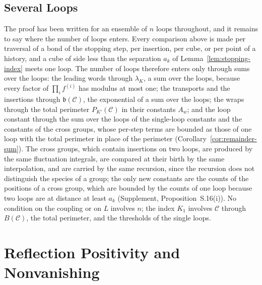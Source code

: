 \documentclass[11pt]{preprint}
\numberwithin{equation}{section}
\theoremstyle{definition}
\theoremstyle{remark}
\theoremstyle{plain}
\begin{document}
\subsection{Several Loops}\label{sec:several-loops-cauchy}

The proof has been written for an ensemble of $n$ loops throughout, and it remains to say where the number of loops enters. Every comparison above is made per traversal of a bond of the stopping step, per insertion, per cube, or per point of a history, and a cube of side less than the separation $a_k$ of Lemma~\ref{lem:stopping-index} meets one loop. The number of loops therefore enters only through sums over the loops: the leading words through $\lambda_K$, a sum over the loops, because every factor of $\prod_if^{(i)}$ has modulus at most one; the transports and the insertions through $\mathfrak b(\mathcal C)$, the exponential of a sum over the loops; the wraps through the total perimeter $P_{K'}(\mathcal C)$ in their constants $A_w$; and the loop constant through the sum over the loops of the single-loop constants and the constants of the cross groups, whose per-step terms are bounded as those of one loop with the total perimeter in place of the perimeter (Corollary~\ref{cor:remainder-sum}). The cross groups, which contain insertions on two loops, are produced by the same fluctuation integrals, are compared at their birth by the same interpolation, and are carried by the same recursion, since the recursion does not distinguish the species of a group; the only new constants are the counts of the positions of a cross group, which are bounded by the counts of one loop because two loops are at distance at least $a_k$ (Supplement, Proposition~S.16(i)). No condition on the coupling or on $L$ involves $n$; the index $K_1$ involves $\mathcal C$ through $B(\mathcal C)$, the total perimeter, and the thresholds of the single loops.

\section{Reflection Positivity and Nonvanishing}\label{sec:reflection-positivity}
\end{document}
